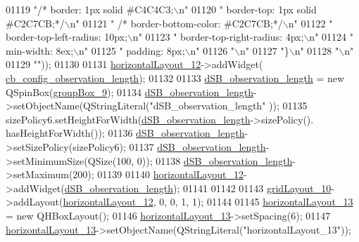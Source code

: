 \begin{DoxyCode}
01119 \textcolor{stringliteral}{"/*     border: 1px solid #C4C4C3;\(\backslash\)n"}
01120 \textcolor{stringliteral}{" border-top: 1px solid #C2C7CB;*/\(\backslash\)n"}
01121 \textcolor{stringliteral}{"   /*  border-bottom-color: #C2C7CB;*/\(\backslash\)n"}
01122 \textcolor{stringliteral}{"     border-top-left-radius: 10px;\(\backslash\)n"}
01123 \textcolor{stringliteral}{"     border-top-right-radius: 4px;\(\backslash\)n"}
01124 \textcolor{stringliteral}{"     min-width: 8ex;\(\backslash\)n"}
01125 \textcolor{stringliteral}{"     padding: 8px;\(\backslash\)n"}
01126 \textcolor{stringliteral}{"\(\backslash\)n"}
01127 \textcolor{stringliteral}{"\}\(\backslash\)n"}
01128 \textcolor{stringliteral}{"\(\backslash\)n"}
01129 \textcolor{stringliteral}{""}));
01130 
01131         \hyperlink{a00080_ad81454913b05646674b1a41c595b8510}{horizontalLayout\_12}->addWidget(
      \hyperlink{a00080_ae9e8f3f0d147a4cd21c8f36ffb3bd81f}{cb\_config\_observation\_length});
01132 
01133         \hyperlink{a00080_a1fe1bf902f2a365c4c94612d2a2ffbcc}{dSB\_observation\_length} = \textcolor{keyword}{new} QSpinBox(\hyperlink{a00080_ab492988d340548c7f30e098419ef10ee}{groupBox\_9});
01134         \hyperlink{a00080_a1fe1bf902f2a365c4c94612d2a2ffbcc}{dSB\_observation\_length}->setObjectName(QStringLiteral(\textcolor{stringliteral}{"dSB\_observation\_length"}
      ));
01135         sizePolicy6.setHeightForWidth(\hyperlink{a00080_a1fe1bf902f2a365c4c94612d2a2ffbcc}{dSB\_observation\_length}->sizePolicy().
      hasHeightForWidth());
01136         \hyperlink{a00080_a1fe1bf902f2a365c4c94612d2a2ffbcc}{dSB\_observation\_length}->setSizePolicy(sizePolicy6);
01137         \hyperlink{a00080_a1fe1bf902f2a365c4c94612d2a2ffbcc}{dSB\_observation\_length}->setMinimumSize(QSize(100, 0));
01138         \hyperlink{a00080_a1fe1bf902f2a365c4c94612d2a2ffbcc}{dSB\_observation\_length}->setMaximum(200);
01139 
01140         \hyperlink{a00080_ad81454913b05646674b1a41c595b8510}{horizontalLayout\_12}->addWidget(\hyperlink{a00080_a1fe1bf902f2a365c4c94612d2a2ffbcc}{dSB\_observation\_length});
01141 
01142 
01143         \hyperlink{a00080_a79b264e6945e3b94a511427b1c270dd7}{gridLayout\_10}->addLayout(\hyperlink{a00080_ad81454913b05646674b1a41c595b8510}{horizontalLayout\_12}, 0, 0, 1, 1);
01144 
01145         \hyperlink{a00080_a3b24c4bb360d79ae2e886fe63c8fdac7}{horizontalLayout\_13} = \textcolor{keyword}{new} QHBoxLayout();
01146         \hyperlink{a00080_a3b24c4bb360d79ae2e886fe63c8fdac7}{horizontalLayout\_13}->setSpacing(6);
01147         \hyperlink{a00080_a3b24c4bb360d79ae2e886fe63c8fdac7}{horizontalLayout\_13}->setObjectName(QStringLiteral(\textcolor{stringliteral}{"horizontalLayout\_13"}));

\end{DoxyCode}
